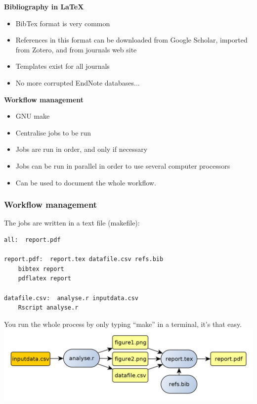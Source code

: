 \documentclass[9pt,xcolor=pdftex,dvipsnames,table]{beamer}
\begin{document}
\begin{frame}{\textbf{Bibliography in LaTeX}}
  \begin{itemize}
  \item BibTex format is very common
  \item References in this format can be downloaded from Google
    Scholar, imported from Zotero, and from journals web site
  \item Templates exist for all journals
  \item No more corrupted EndNote databases...
  \end{itemize}
\end{frame}


\begin{frame}{\textbf{Workflow management}}
  \begin{itemize}
  \item GNU make
  \item Centralise jobs to be run
  \item Jobs are run in order, and only if necessary
  \item Jobs can be run in parallel in order to use several computer processors
  \item Can be used to document the whole workflow.
  \end{itemize}
\end{frame}


\begin{frame}[fragile] %
\frametitle{\textbf{Workflow management}}
The jobs are written in a text file (makefile):
\small{
\begin{verbatim}
all:  report.pdf

report.pdf:  report.tex datafile.csv refs.bib
    bibtex report 
    pdflatex report

datafile.csv:  analyse.r inputdata.csv
    Rscript analyse.r
\end{verbatim}}
\vspace{0.25cm}
You run the whole process by only typing ``make'' in a terminal, it's
that easy.
\includegraphics[width=1\textwidth]{images/workflow.png}
\vspace{-1cm}
\end{frame}
\end{document}
